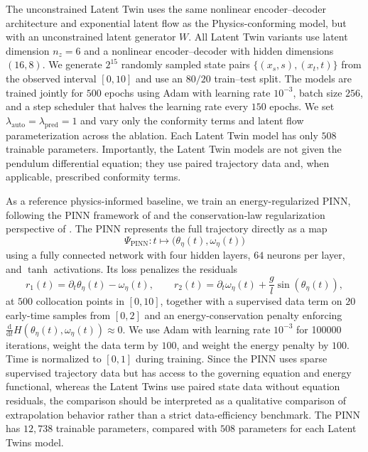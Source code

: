 \documentclass[a4paper,fleqn]{cas-sc}
\theoremstyle{thmstyleone}%
\theoremstyle{thmstyletwo}%
\theoremstyle{thmstylethree}%
\begin{document}
The unconstrained Latent Twin uses the same nonlinear encoder--decoder architecture and exponential latent flow as the Physics-conforming model, but with an unconstrained latent generator $W$. All Latent Twin variants use latent dimension $n_z=6$ and a nonlinear encoder--decoder with hidden dimensions $(16,8)$. We generate $2^{15}$ randomly sampled state pairs $\{(x_s,s),(x_t,t)\}$ from the observed interval $[0,10]$ and use an $80/20$ train--test split. The models are trained jointly for $500$ epochs using Adam with learning rate $10^{-3}$, batch size $256$, and a step scheduler that halves the learning rate every $150$ epochs. We set $\lambda_{\mathrm{auto}}=\lambda_{\mathrm{pred}}=1$ and vary only the conformity terms and latent flow parameterization across the ablation. Each Latent Twin model has only $508$ trainable parameters. Importantly, the Latent Twin models are not given the pendulum differential equation; they use paired trajectory data and, when applicable, prescribed conformity terms.

As a reference physics-informed baseline, we train an energy-regularized PINN, following the PINN framework of \cite{raissi2019physics} and the conservation-law regularization perspective of \cite{baez2024guaranteeing}. The PINN represents the full trajectory directly as a map
\[
    \Psi_{\mathrm{PINN}}:t\mapsto \bigl(\theta_\eta(t),\omega_\eta(t)\bigr)
\]
using a fully connected network with four hidden layers, $64$ neurons per layer, and $\tanh$ activations. Its loss penalizes the residuals
\[
    r_1(t)=\partial_t\theta_\eta(t)-\omega_\eta(t),
    \qquad
    r_2(t)=\partial_t\omega_\eta(t)+\frac{g}{l}\sin(\theta_\eta(t)),
\]
at $500$ collocation points in $[0,10]$, together with a supervised data term on $20$ early-time samples from $[0,2]$ and an energy-conservation penalty enforcing $\frac{\mathrm d}{\mathrm dt}H(\theta_\eta(t),\omega_\eta(t))\approx0$. We use Adam with learning rate $10^{-3}$ for \num{100000} iterations, weight the data term by $100$, and weight the energy penalty by $100$. Time is normalized to $[0,1]$ during training. Since the PINN uses sparse supervised trajectory data but has access to the governing equation and energy functional, whereas the Latent Twins use paired state data without equation residuals, the comparison should be interpreted as a qualitative comparison of extrapolation behavior rather than a strict data-efficiency benchmark. The PINN has $12{,}738$ trainable parameters, compared with $508$ parameters for each Latent Twins model.
\end{document}
